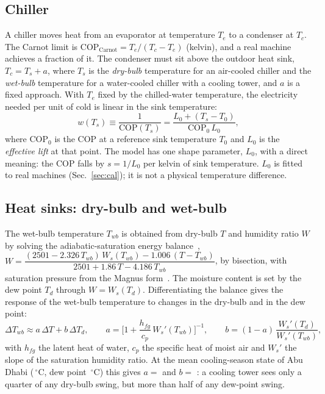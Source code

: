 \documentclass[10pt,a4paper]{article}
\newcommand{\C}{\,^\circ\mathrm{C}}
\begin{document}
\subsection{Chiller}
A chiller moves heat from an evaporator at temperature $T_e$ to a condenser at $T_c$. The Carnot limit is
$\mathrm{COP}_{\text{Carnot}}=T_e/(T_c-T_e)$ (kelvin), and a real machine achieves a fraction of it. The condenser
must sit above the outdoor heat sink, $T_c=T_s+a$, where $T_s$ is the \emph{dry-bulb} temperature for an air-cooled
chiller and the \emph{wet-bulb} temperature for a water-cooled chiller with a cooling tower, and $a$ is a fixed
approach. With $T_e$ fixed by the chilled-water temperature, the electricity needed per unit of cold is linear in the
sink temperature:
\begin{equation}
w(T_s)\equiv\frac{1}{\mathrm{COP}(T_s)}=\frac{L_0+(T_s-T_0)}{\mathrm{COP}_0\,L_0},
\label{eq:w}
\end{equation}
where $\mathrm{COP}_0$ is the COP at a reference sink temperature $T_0$ and $L_0$ is the \emph{effective lift} at that
point. The model has one shape parameter, $L_0$, with a direct meaning: the COP falls by $s=1/L_0$ per kelvin of
sink temperature. $L_0$ is fitted to real machines (Sec.~\ref{sec:cal}); it is not a physical temperature difference.

\subsection{Heat sinks: dry-bulb and wet-bulb}
The wet-bulb temperature $T_{wb}$ is obtained from dry-bulb $T$ and humidity ratio $W$ by solving the
adiabatic-saturation energy balance~\cite{ashrae},
$W=\dfrac{(2501-2.326\,T_{wb})\,W_s(T_{wb})-1.006\,(T-T_{wb})}{2501+1.86\,T-4.186\,T_{wb}}$,
by bisection, with saturation pressure from the Magnus form~\cite{magnus}. The moisture content is set by the dew
point $T_d$ through $W=W_s(T_d)$. Differentiating the balance gives the response of the wet-bulb temperature to
changes in the dry-bulb and in the dew point:
\begin{equation}
\Delta T_{wb}\approx a\,\Delta T+b\,\Delta T_d,\qquad
a=\Big[1+\frac{h_{fg}}{c_p}\,W_s'(T_{wb})\Big]^{-1},\qquad
b=(1-a)\,\frac{W_s'(T_d)}{W_s'(T_{wb})},
\label{eq:twb}
\end{equation}
with $h_{fg}$ the latent heat of water, $c_p$ the specific heat of moist air and $W_s'$ the slope of the saturation
humidity ratio. At the mean cooling-season state of Abu Dhabi (\TMean$\C$, dew point \TdMean$\C$) this gives
$a=$ \textbf{\DampA} and $b=$ \textbf{\DampB}: a cooling tower sees only a quarter of any dry-bulb swing, but more
than half of any dew-point swing.
\end{document}
